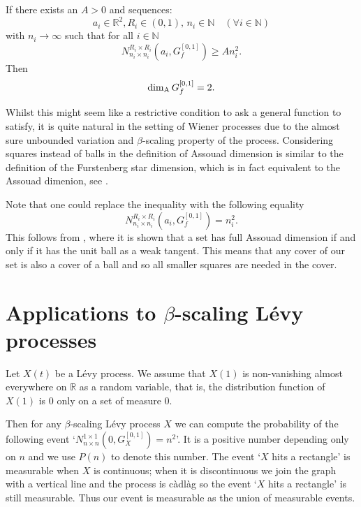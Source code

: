 \begin{theorem}\label{graph}
	If there exists an $A>0$ and sequences:
	\[
	a_i\in \mathbb{R}^2,R_i\in (0,1),\, n_i\in\mathbb{N} \quad (\forall i\in \mathbb{N})
	\]
	with $n_i \rightarrow \infty$ such that for all $i\in\mathbb{N}$
	\[
	N_{n_i\times n_i}^{R_i \times R_i }(a_i,G_f^{[0,1]})\geq A n_i^2.
	\]
	Then
	\[
	\dim_{\textup{A}} G_f^{[0,1]}=2.
	\]
\end{theorem}

Whilst this might seem like a restrictive condition to ask a general function to satisfy, it is quite natural in the setting of Wiener processes due to the almost sure unbounded variation and $\beta$-scaling property of the process. Considering squares instead of balls in the definition of Assouad dimension is similar to the definition of the Furstenberg star dimension, which is in fact equivalent to the Assouad dimenion, see \cite{chenwuwu}.

\begin{remark}
	Note that one could replace the inequality with the following equality
	\[
	N_{n_i\times n_i}^{R_i \times R_i }(a_i,G_f^{[0,1]})= n_i^2.
	\]
	This follows from \cite[Theorem 2.4]{FY}, where it is shown that a set has full Assouad dimension if and only if it has the unit ball as a weak tangent. This means that any cover of our set is also a cover of a ball and so all smaller squares are needed in the cover.
\end{remark}

\section{Applications to  $\beta$-scaling L\'evy processes}\label{LP}

Let $X(t)$ be a L\'evy process. We assume that $X(1)$ is non-vanishing almost everywhere on $\mathbb{R}$ as a random variable, that is, the distribution function of $X(1)$ is 0 only on a set of measure 0. 

Then for any $\beta$-scaling L\'evy process $X$ we can compute the probability of the following event `$N_{n\times n}^{1 \times 1 }(0,G_X^{[0,1]})=n^2$'. It is a positive number depending only on $n$ and we use $P(n)$ to denote this number. The event `$X$ hits a rectangle' is measurable when $X$ is continuous; when it is discontinuous we join the graph with a vertical line and the process is c\`adl\`ag so the event `$X$ hits a rectangle' is still measurable. Thus our event is measurable as the union of measurable events.

